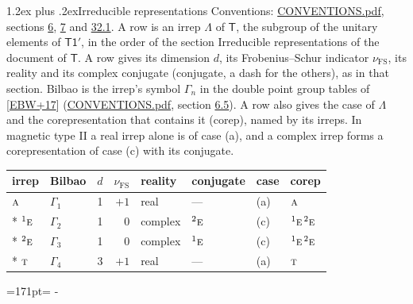 \documentclass[10pt,a4paper]{article}
\makeatletter
\renewcommand\section{\@startsection{section}{1}{\z@}{-3ex plus -1ex minus -.2ex}%
  {1.2ex plus .2ex}{\normalfont\large\sffamily\bfseries\color{parttitle}}}
\newcommand{\needspace}[1]{\par\penalty-100\begingroup\dimen0=#1\relax\dimen2=\pagegoal
  \advance\dimen2-\pagetotal\ifdim\dimen0>\dimen2\relax\ifdim\dimen2>0pt\vfil\break\fi\fi
  \endgroup}
\numberwithin{equation}{section}
\newcommand{\grp}[1]{\mathsf{#1}}
\newcommand{\irr}[1]{\text{\normalfont\scshape #1}}
\newcommand{\conjpair}[1]{{}^{#1}}
\newcommand{\fsind}{\nu_{\mathrm{FS}}}
\makeatother
\begin{document}
\section{Irreducible representations}\label{s:irreps}
Conventions: \href{../../CONVENTIONS.pdf}{CONVENTIONS.pdf}, sections \href{../../../rotation/CONVENTIONS.pdf\#conv.6}{6}, \href{../../../rotation/CONVENTIONS.pdf\#conv.7}{7} and \href{../../CONVENTIONS.pdf\#conv.32.1}{32.1}.
\leavevmode\label{n:irrep.Delta}A row is an irrep $\Lambda$ of $\grp{T}$, the subgroup of the unitary elements of $\grp{T1'}$, in the order of the section Irreducible representations of the document of \href{../../../rotation/data/pdf/T.pdf}{$\grp{T}$}. \label{n:index.dimension}\label{n:index.frobenius}\label{n:head.irrep}\label{n:head.reality}\label{n:head.conjugate}A row gives its dimension $d$, its Frobenius--Schur indicator $\fsind$, its reality and its complex conjugate (conjugate, a dash for the others), as in that section. \label{n:head.bilbao}\label{n:irrep.alias.gamma}Bilbao is the irrep's symbol $\Gamma_n$ in the double point group tables of [\href{../../../REFERENCES.pdf\#ref.EBW+17}{EBW+17}] (\href{../../CONVENTIONS.pdf}{CONVENTIONS.pdf}, section \href{../../../rotation/CONVENTIONS.pdf\#conv.6.5}{6.5}). \label{n:head.case.corep}\label{n:head.corep}A row also gives the case of $\Lambda$ and the corepresentation that contains it (corep), named by its irreps. In magnetic type II a real irrep alone is of case (a), and a complex irrep forms a corepresentation of case (c) with its conjugate.
\setlength{\emergencystretch}{2em}\par\setlength{\emergencystretch}{0pt}
{\small\renewcommand{\arraystretch}{1.25}\setlength{\tabcolsep}{4pt}\begin{longtable}{@{}llrrllll@{}}\toprule
irrep & Bilbao & $d$ & $\fsind$ & reality & conjugate & case & corep\\\midrule\endhead
\bottomrule\endfoot\endlastfoot
$\irr{a}$ & $\Gamma_{1}$ & 1 & $+1$ & real & --- & (a) & $\irr{a}$\\*
$\conjpair{1}\irr{e}$ & $\Gamma_{2}$ & 1 & $0$ & complex & $\conjpair{2}\irr{e}$ & (c) & $\conjpair{1}\irr{e}\,\conjpair{2}\irr{e}$\\*
$\conjpair{2}\irr{e}$ & $\Gamma_{3}$ & 1 & $0$ & complex & $\conjpair{1}\irr{e}$ & (c) & $\conjpair{1}\irr{e}\,\conjpair{2}\irr{e}$\\*
$\irr{t}$ & $\Gamma_{4}$ & 3 & $+1$ & real & --- & (a) & $\irr{t}$\\
\bottomrule\end{longtable}}
\needspace{171pt}
\end{document}
